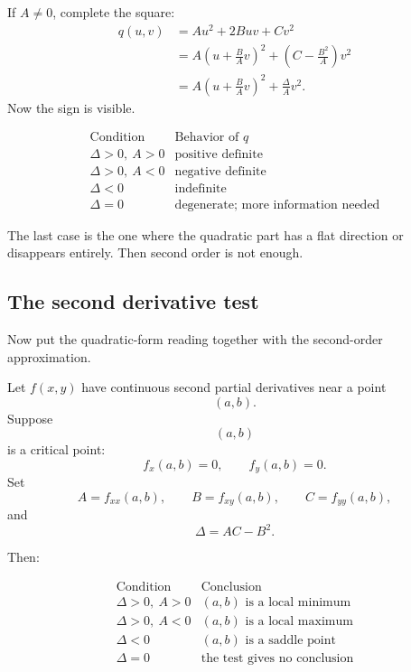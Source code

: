 If \(A\ne0\), complete the square:
\[
\begin{aligned}
    q(u,v)
    &=
    Au^2+2Buv+Cv^2\\
    &=
    A\left(u+\frac{B}{A}v\right)^2
    +
    \left(C-\frac{B^2}{A}\right)v^2\\
    &=
    A\left(u+\frac{B}{A}v\right)^2
    +
    \frac{\Delta}{A}v^2.
\end{aligned}
\]
Now the sign is visible.

\[
\begin{array}{c|c}
\text{Condition} & \text{Behavior of }q\\ \hline
\Delta>0,\ A>0 & \text{positive definite}\\[1mm]
\Delta>0,\ A<0 & \text{negative definite}\\[1mm]
\Delta<0 & \text{indefinite}\\[1mm]
\Delta=0 & \text{degenerate; more information needed}
\end{array}
\]

The last case is the one where the quadratic part has a flat direction or disappears
entirely.  Then second order is not enough.

\subsection{The second derivative test}

Now put the quadratic-form reading together with the second-order approximation.

\begin{theorem}
Let \(f(x,y)\) have continuous second partial derivatives near a point
\[
    (a,b).
\]
Suppose
\[
    (a,b)
\]
is a critical point:
\[
    f_x(a,b)=0,
    \qquad
    f_y(a,b)=0.
\]
Set
\[
    A=f_{xx}(a,b),
    \qquad
    B=f_{xy}(a,b),
    \qquad
    C=f_{yy}(a,b),
\]
and
\[
    \Delta=AC-B^2.
\]

Then:

\[
\begin{array}{c|c}
\text{Condition} & \text{Conclusion}\\ \hline
\Delta>0,\ A>0 & \text{\((a,b)\) is a local minimum}\\[1mm]
\Delta>0,\ A<0 & \text{\((a,b)\) is a local maximum}\\[1mm]
\Delta<0 & \text{\((a,b)\) is a saddle point}\\[1mm]
\Delta=0 & \text{the test gives no conclusion}
\end{array}
\]
\end{theorem}

